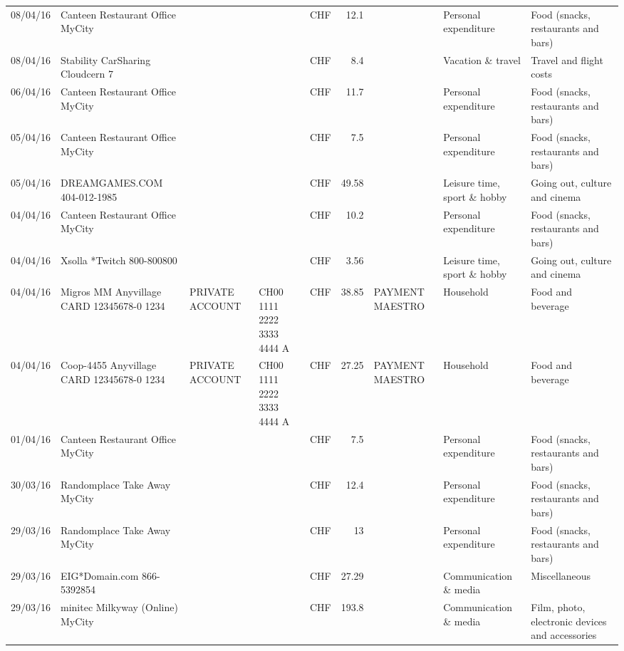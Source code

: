 \begin{landscape}
\begin{table}[h]
\begin{center}
\begin{tabular}{rllllrlll}
		08/04/16 & Canteen Restaurant Office      MyCity &       &       & CHF   & 12.1  &       & Personal expenditure & Food (snacks, restaurants and bars) \\
		08/04/16 & Stability CarSharing      Cloudcern 7 &       &       & CHF   & 8.4   &       & Vacation \& travel & Travel and flight costs \\
		06/04/16 & Canteen Restaurant Office      MyCity &       &       & CHF   & 11.7  &       & Personal expenditure & Food (snacks, restaurants and bars) \\
		05/04/16 & Canteen Restaurant Office      MyCity &       &       & CHF   & 7.5   &       & Personal expenditure & Food (snacks, restaurants and bars) \\
		05/04/16 & DREAMGAMES.COM           404-012-1985 &       &       & CHF   & 49.58 &       & Leisure time, sport \& hobby & Going out, culture and cinema \\
		04/04/16 & Canteen Restaurant Office      MyCity &       &       & CHF   & 10.2  &       & Personal expenditure & Food (snacks, restaurants and bars) \\
		04/04/16 & Xsolla *Twitch           800-800800 &       &       & CHF   & 3.56  &       & Leisure time, sport \& hobby & Going out, culture and cinema \\
		04/04/16 & Migros MM Anyvillage CARD 12345678-0 1234 & PRIVATE ACCOUNT & CH00 1111 2222 3333 4444 A & CHF   & 38.85 & PAYMENT MAESTRO & Household & Food and beverage \\
		04/04/16 & Coop-4455 Anyvillage CARD 12345678-0 1234 & PRIVATE ACCOUNT & CH00 1111 2222 3333 4444 A & CHF   & 27.25 & PAYMENT MAESTRO & Household & Food and beverage \\
		01/04/16 & Canteen Restaurant Office      MyCity &       &       & CHF   & 7.5   &       & Personal expenditure & Food (snacks, restaurants and bars) \\
		30/03/16 & Randomplace Take Away     MyCity &       &       & CHF   & 12.4  &       & Personal expenditure & Food (snacks, restaurants and bars) \\
		29/03/16 & Randomplace Take Away     MyCity &       &       & CHF   & 13    &       & Personal expenditure & Food (snacks, restaurants and bars) \\
		29/03/16 & EIG*Domain.com           866-5392854 &       &       & CHF   & 27.29 &       & Communication \& media & Miscellaneous \\
		29/03/16 & minitec Milkyway (Online) MyCity &       &       & CHF   & 193.8 &       & Communication \& media & Film, photo, electronic devices and accessories \\

\end{tabular}
\end{center}
\end{table}
\end{landscape}
